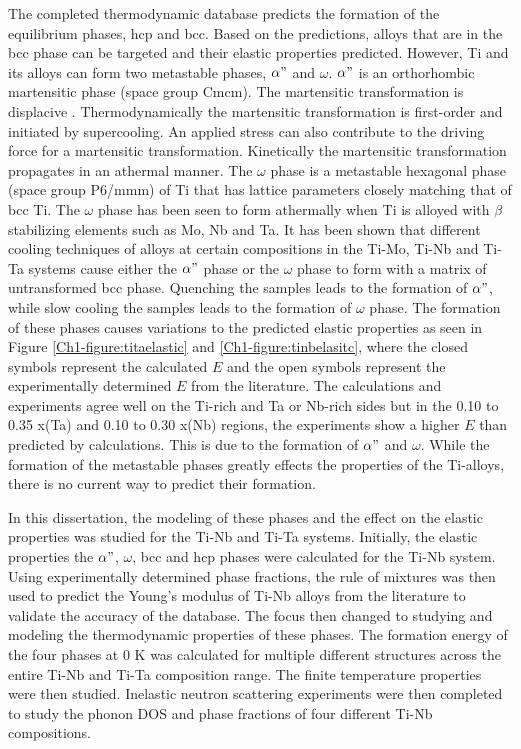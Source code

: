 The completed thermodynamic database predicts the formation of the equilibrium phases, hcp and bcc. Based on the predictions, alloys that are in the bcc phase can be targeted and their elastic properties predicted. However, Ti and its alloys can form two metastable phases, $\alpha"$ and $\omega$. $\alpha"$ is an orthorhombic martensitic phase (space group Cmcm). The martensitic transformation is displacive \cite{Khachaturyan1985,Salje1990}. Thermodynamically the martensitic transformation is first-order and initiated by supercooling. An applied stress can also contribute to the driving force for a martensitic transformation. Kinetically the martensitic transformation propagates in an athermal manner. The $\omega$ phase is a metastable hexagonal phase (space group P6/mmm) of Ti that has lattice parameters closely matching that of bcc Ti. The $\omega$ phase has been seen to form athermally when Ti is alloyed with $\beta$ stabilizing elements such as Mo, Nb and Ta. It has been shown that different cooling techniques of alloys at certain compositions in the Ti-Mo, Ti-Nb and Ti-Ta systems cause either the $\alpha"$ phase or the $\omega$ phase to form with a matrix of untransformed bcc phase. Quenching the samples leads to the formation of $\alpha"$, while slow cooling the samples leads to the formation of $\omega$ phase. The formation of these phases causes variations to the predicted elastic properties as seen in Figure \ref{Ch1-figure:titaelastic} and \ref{Ch1-figure:tinbelasitc}, where the closed symbols represent the calculated $E$ and the open symbols represent the experimentally determined $E$ from the literature. The calculations and experiments agree well on the Ti-rich and Ta or Nb-rich sides but in the 0.10 to 0.35 x(Ta) and 0.10 to 0.30 x(Nb) regions, the experiments show a higher $E$ than predicted by calculations. This is due to the formation of $\alpha"$ and $\omega$. While the formation of the metastable phases greatly effects the properties of the Ti-alloys, there is no current way to predict their formation. 

In this dissertation, the modeling of these phases and the effect on the elastic properties was studied for the Ti-Nb and Ti-Ta systems. Initially, the elastic properties the $\alpha"$, $\omega$, bcc and hcp phases were calculated for the Ti-Nb system. Using experimentally determined phase fractions, the rule of mixtures was then used to predict the Young's modulus of Ti-Nb alloys from the literature to validate the accuracy of the database. The focus then changed to studying and modeling the thermodynamic properties of these phases. The formation energy of the four phases at 0 K was calculated for multiple different structures across the entire Ti-Nb and Ti-Ta composition range. The finite temperature properties were then studied. Inelastic neutron scattering experiments were then completed to study the phonon DOS and phase fractions of four different Ti-Nb compositions.

